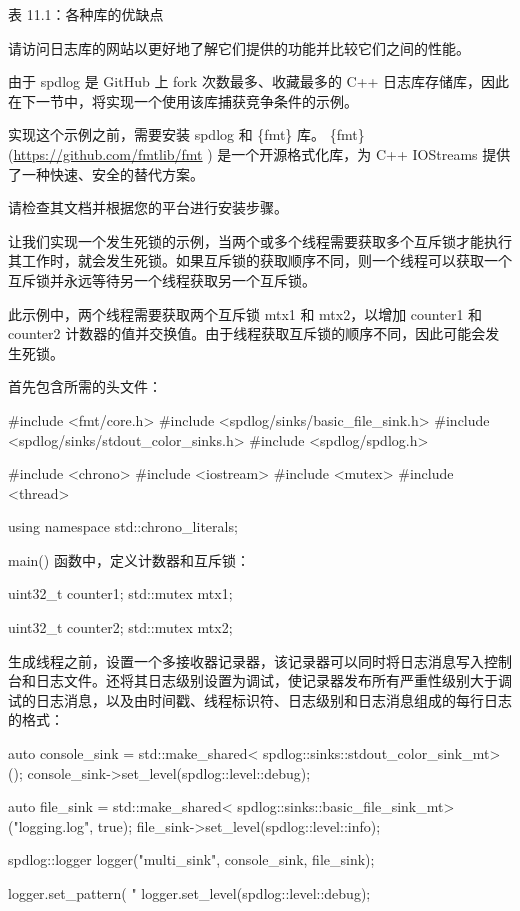 \begin{center}
表 11.1：各种库的优缺点
\end{center}

请访问日志库的网站以更好地了解它们提供的功能并比较它们之间的性能。

由于 spdlog 是 GitHub 上 fork 次数最多、收藏最多的 C++ 日志库存储库，因此在下一节中，将实现一个使用该库捕获竞争条件的示例。


实现这个示例之前，需要安装 spdlog 和 \{fmt\} 库。 \{fmt\} (\url{https://github.com/fmtlib/fmt} ) 是一个开源格式化库，为 C++ IOStreams 提供了一种快速、安全的替代方案。

请检查其文档并根据您的平台进行安装步骤。

让我们实现一个发生死锁的示例，当两个或多个线程需要获取多个互斥锁才能执行其工作时，就会发生死锁。如果互斥锁的获取顺序不同，则一个线程可以获取一个互斥锁并永远等待另一个线程获取另一个互斥锁。

此示例中，两个线程需要获取两个互斥锁 mtx1 和 mtx2，以增加 counter1 和 counter2 计数器的值并交换值。由于线程获取互斥锁的顺序不同，因此可能会发生死锁。

首先包含所需的头文件：

\begin{cpp}
#include <fmt/core.h>
#include <spdlog/sinks/basic_file_sink.h>
#include <spdlog/sinks/stdout_color_sinks.h>
#include <spdlog/spdlog.h>

#include <chrono>
#include <iostream>
#include <mutex>
#include <thread>

using namespace std::chrono_literals;
\end{cpp}

main() 函数中，定义计数器和互斥锁：

\begin{cpp}
uint32_t counter1{};
std::mutex mtx1;

uint32_t counter2{};
std::mutex mtx2;
\end{cpp}

生成线程之前，设置一个多接收器记录器，该记录器可以同时将日志消息写入控制台和日志文件。还将其日志级别设置为调试，使记录器发布所有严重性级别大于调试的日志消息，以及由时间戳、线程标识符、日志级别和日志消息组成的每行日志的格式：

\begin{cpp}
auto console_sink = std::make_shared<
            spdlog::sinks::stdout_color_sink_mt>();
console_sink->set_level(spdlog::level::debug);

auto file_sink = std::make_shared<
            spdlog::sinks::basic_file_sink_mt>("logging.log",
                                                true);
file_sink->set_level(spdlog::level::info);

spdlog::logger logger("multi_sink",
        {console_sink, file_sink});

logger.set_pattern(
            "%
logger.set_level(spdlog::level::debug);
\end{cpp}

